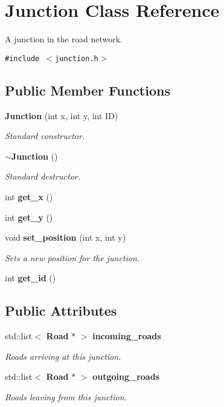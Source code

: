 \section{Junction Class Reference}
\label{classJunction}
A junction in the road network.  


{\tt \#include $<$junction.h$>$}

\subsection*{Public Member Functions}
\begin{CompactItemize}
\item 
{\bf Junction} (int x, int y, int ID)
\begin{CompactList}\small\item\em Standard constructor. \item\end{CompactList}\item 
{\bf $\sim$Junction} ()
\begin{CompactList}\small\item\em Standard destructor. \item\end{CompactList}\item 
int {\bf get\_\-x} ()
\item 
int {\bf get\_\-y} ()
\item 
void {\bf set\_\-position} (int x, int y)
\begin{CompactList}\small\item\em Sets a new position for the junction. \item\end{CompactList}\item 
int {\bf get\_\-id} ()
\end{CompactItemize}
\subsection*{Public Attributes}
\begin{CompactItemize}
\item 
std::list$<$ {\bf Road} $\ast$ $>$ {\bf incoming\_\-roads}
\begin{CompactList}\small\item\em Roads arriving at this junction. \item\end{CompactList}\item 
std::list$<$ {\bf Road} $\ast$ $>$ {\bf outgoing\_\-roads}
\begin{CompactList}\small\item\em Roads leaving from this junction. \item\end{CompactList}\end{CompactItemize}


